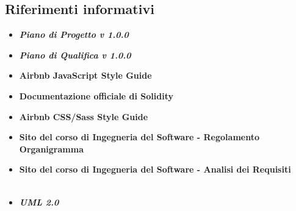 \documentclass[NormeDiProgetto.tex]{subfiles}
\begin{document}
\subsection{Riferimenti informativi}
\begin{itemize}
	\item \textbf{\textit{Piano di Progetto v 1.0.0}}
	\item \textbf{\textit{Piano di Qualifica v 1.0.0}}
	\item \textbf{Airbnb JavaScript Style Guide}\\
	\item \textbf{Documentazione officiale di Solidity}\\
	\item \textbf{Airbnb CSS/Sass Style Guide}\\
	\item \textbf{Sito del corso di Ingegneria del Software - Regolamento Organigramma}\\
	\item \textbf{Sito del corso di Ingegneria del Software - Analisi dei Requisiti}\\
	\\
	\item \textbf{\textit{UML 2.0}}\\
\end{itemize}
\end{document}
